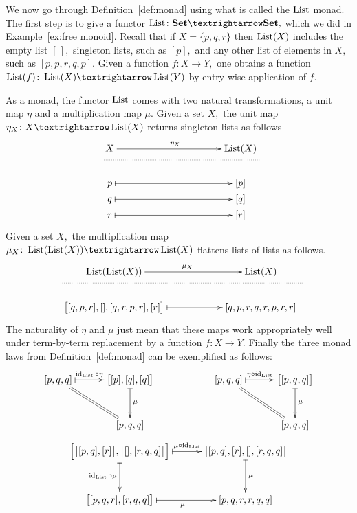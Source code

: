 \documentclass[../main/CT4S-EN-RU]{subfiles}
\begin{document}
\begin{exampleENG}\label{ex:monad}
We now go through Definition~\ref{def:monad} using what is called the $\operatorname{List}$ monad. The first step is to give a functor $\List\colon\Set{→}\Set,$ which we did in Example~\ref{ex:free monoid}. Recall that if $X=\{p,q,r\}$ then $\operatorname{List}(X)$ includes the empty list $[\,],$ singleton lists, such as $[p],$ and any other list of elements in $X,$ such as $[p,p,r,q,p].$ Given a function $f\colon X{→} Y,$ one obtains a function $\List(f)\colon\List(X){→}\List(Y)$ by entry-wise application of $f.$

As a monad, the functor $\operatorname{List}$ comes with two natural transformations, a unit map $\eta$ and a multiplication map $\mu.$ Given a set $X,$ the unit map $\eta_X\colon X{→}\List(X)$ returns singleton lists as follows
$$\xymatrix@=.5pt{
&X\ar[rr]^{\eta_X}&\hspace{1.4in}&\List(X)\\
\ar@{..}[rrr]+<.3in,0pt>&&&\\\\\\
&p\ar@{|->}[rr]&&[p]\\
&q\ar@{|->}[rr]&&[q]\\
&r\ar@{|->}[rr]&&[r]}$$
Given a set $X,$ the multiplication map $\mu_X\colon\List(\List(X)){→}\List(X)$ flattens lists of lists as follows.
$$\xymatrix@=.5pt{
&\List(\List(X))\ar[rr]^{\mu_X}&\hspace{.7in}&\List(X)\\
\ar@{..}[rrr]+<.6in,0pt>&&&\\\\\\
&\big[[q, p, r], [], [q, r, p, r], [r]\big]\ar@{|->}[rr]&&[q, p, r, q, r, p, r, r]}$$
The naturality of $\eta$ and $\mu$ just mean that these maps work appropriately well under term-by-term replacement by a function $f\colon X{→} Y.$ Finally the three monad laws from Definition~\ref{def:monad} can be exemplified as follows:
$$\xymatrix@=30pt{
[p, q, q]\ar@{|->}[r]^-{\id_{\List}\circ\eta}\ar@{=}[rd]&\big[[p], [q], [q]\big]\ar@{|->}[d]^\mu\\&[p, q, q]
}\hspace{.8in}
\xymatrix@=30pt{
[p, q, q]\ar@{|->}[r]^-{\eta\circ\id_{\List}}\ar@{=}[rd]&\big[[p, q, q]\big]\ar@{|->}[d]^\mu\\&[p,q,q]
}$$
\vspace{.1in}
$$\xymatrix@=30pt{
\Big[\big[[p, q], [r]\big], \big[[], [r, q, q]\big]\Big]\ar@{|->}[r]^-{\mu\circ\id_{\List}}\ar@{|->}[d]_{\id_{\List}\circ\mu}&\big[[p, q], [r], [], [r, q, q]\big]\ar@{|->}[d]^\mu\\\big[[p, q, r], [r, q, q]\big]\ar@{|->}[r]_\mu&[p, q, r, r, q,q]
}$$
\end{exampleENG}
\end{document}
